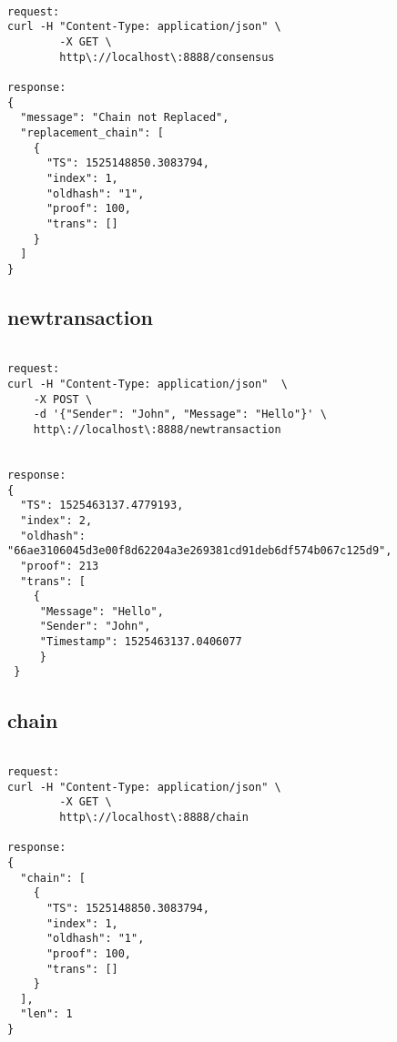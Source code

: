 \bigskip
\noindent
\begin{footnotesize}
\begin{verbatim}

request:
curl -H "Content-Type: application/json" \
        -X GET \
        http\://localhost\:8888/consensus

response:
{
  "message": "Chain not Replaced",
  "replacement_chain": [
    {
      "TS": 1525148850.3083794,
      "index": 1,
      "oldhash": "1",
      "proof": 100,
      "trans": []
    }
  ]
}

\end{verbatim}
\end{footnotesize}

\subsection{newtransaction}

\bigskip
\noindent
\begin{footnotesize}
\begin{verbatim}

request:
curl -H "Content-Type: application/json"  \
    -X POST \
    -d '{"Sender": "John", "Message": "Hello"}' \
    http\://localhost\:8888/newtransaction
	

response:
{
  "TS": 1525463137.4779193,
  "index": 2,
  "oldhash": "66ae3106045d3e00f8d62204a3e269381cd91deb6df574b067c125d9",
  "proof": 213
  "trans": [
    {
     "Message": "Hello",
     "Sender": "John",
     "Timestamp": 1525463137.0406077
     }
 }

\end{verbatim}
\end{footnotesize}

\subsection{chain}

\bigskip
\noindent
\begin{footnotesize}
\begin{verbatim}

request:
curl -H "Content-Type: application/json" \
        -X GET \
        http\://localhost\:8888/chain
        
response:
{
  "chain": [
    {
      "TS": 1525148850.3083794,
      "index": 1,
      "oldhash": "1",
      "proof": 100,
      "trans": []
    }
  ],
  "len": 1
}

\end{verbatim}
\end{footnotesize}

